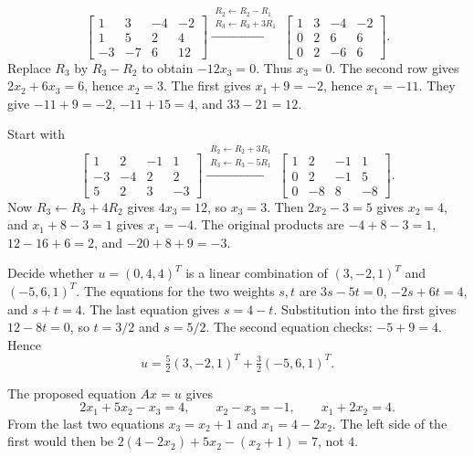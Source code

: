 \[\left[\begin{array}{rrr|r}1&3&-4&-2\\1&5&2&4\\-3&-7&6&12\end{array}\right]
\xrightarrow{\substack{R_2\leftarrow R_2-R_1\\R_3\leftarrow R_3+3R_1}}
\left[\begin{array}{rrr|r}1&3&-4&-2\\0&2&6&6\\0&2&-6&6\end{array}\right].\]
Replace $R_3$ by $R_3-R_2$ to obtain $-12x_3=0$. Thus $x_3=0$.
The second row gives $2x_2+6x_3=6$, hence $x_2=3$.
The first gives $x_1+9=-2$, hence $x_1=-11$.
They give $-11+9=-2$, $-11+15=4$, and $33-21=12$.

Start with
\[\left[\begin{array}{rrr|r}1&2&-1&1\\-3&-4&2&2\\5&2&3&-3\end{array}\right]
\xrightarrow{\substack{R_2\leftarrow R_2+3R_1\\R_3\leftarrow R_3-5R_1}}
\left[\begin{array}{rrr|r}1&2&-1&1\\0&2&-1&5\\0&-8&8&-8\end{array}\right].\]
Now $R_3\leftarrow R_3+4R_2$ gives $4x_3=12$, so $x_3=3$.
Then $2x_2-3=5$ gives $x_2=4$, and $x_1+8-3=1$ gives $x_1=-4$.
The original products are $-4+8-3=1$, $12-16+6=2$,
and $-20+8+9=-3$.

\goal Decide whether $u=(0,4,4)^T$ is a linear combination of
$(3,-2,1)^T$ and $(-5,6,1)^T$.
The equations for the two weights $s,t$ are
$3s-5t=0$, $-2s+6t=4$, and $s+t=4$.
The last equation gives $s=4-t$. Substitution into the first gives
$12-8t=0$, so $t=3/2$ and $s=5/2$.
The second equation checks: $-5+9=4$. Hence
\[u=\tfrac52(3,-2,1)^T+\tfrac32(-5,6,1)^T.\]

The proposed equation $Ax=u$ gives
\[2x_1+5x_2-x_3=4,\qquad x_2-x_3=-1,\qquad x_1+2x_2=4.\]
From the last two equations $x_3=x_2+1$ and $x_1=4-2x_2$.
The left side of the first would then be
$2(4-2x_2)+5x_2-(x_2+1)=7$, not $4$.

